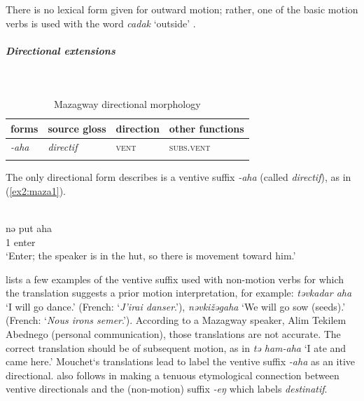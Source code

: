 There is no lexical form given for outward motion; rather, one of the basic motion verbs is used with the word \textit{cadak} `outside' \citep[220]{mouchetParlerDabaEsquisse1966}. 

\subparagraph{Directional extensions}~

\begin{table}[H]
\caption{Mazagway directional morphology}
\label{tab:maza}
\begin{tabular}{llll} %
	\lsptoprule
	forms & source gloss & direction  & other functions  \\ %
	\midrule
	\textit{-aha}  &  \textit{directif}  &   \textsc{vent} &   \textsc{subs.vent}   \\
	\lspbottomrule
\end{tabular}
\end{table} 

The only directional form \citet{mouchetParlerDabaEsquisse1966} describes is a ventive suffix \textit{-aha} (called \textit{directif}), as in (\ref{ex2:maza1}). 

\ea\label{ex2:maza1}
 \\
\gll  nə	put	aha \\
1	enter	 \\
\glt `Enter; the speaker is in the hut, so there is movement toward him.' 
\z 

\citet[85]{mouchetParlerDabaEsquisse1966} lists a few examples of the ventive suffix used with non-motion verbs for which the translation suggests a prior motion interpretation, for example: \textit{təvkadar aha} `I will go dance.' (French: `\textit{J'irai danser}.'), \textit{nəvkižəgaha} `We will go sow (seeds).' (French: `\textit{Nous irons semer}.'). According to a Mazagway speaker, Alim Tekilem Abednego (personal communication), those translations are not accurate. The correct translation should be of subsequent motion, as in \textit{tə ham-aha} ‘I ate and came here.’ Mouchet‘s translations lead \citet[313]{schuhChadicCornucopia2017} to label the ventive suffix \textit{-aha} as an itive directional. \citet[313]{schuhChadicCornucopia2017} also follows \citet{newmanChadicExtensionsPredative1977} in making a tenuous etymological connection between ventive directionals and the (non-motion) suffix \textit{-eŋ} which \citet[84]{mouchetParlerDabaEsquisse1966} labels \textit{destinatif}. %

